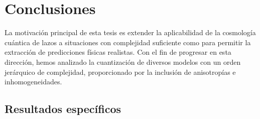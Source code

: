 {\renewcommand{\thechapter}{}\renewcommand{\chaptername}{}
\addtocounter{chapter}{0}
\chapter*{Conclusiones}}

La motivación principal de esta tesis es extender la aplicabilidad de la cosmología
cuántica de lazos
a situaciones con complejidad suficiente como para permitir la extracción de predicciones físicas
realistas. Con el fin de progresar en esta dirección, hemos analizado la cuantización de diversos
modelos con un orden jerárquico de complejidad, proporcionado por la inclusión de anisotropías e
inhomogeneidades.

\section*{Resultados específicos}

